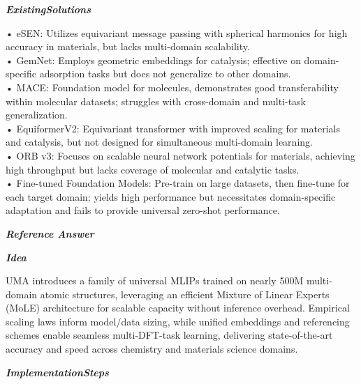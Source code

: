 \begin{tcolorbox}[
    breakable,
    title={Example of Idea Generation in Physics},
    colback=LighterGray,
    colframe=DeepPurple,
    colbacktitle=DeepPurple,
    coltitle=White,
]
\textbf{\emph{\textcolor{CaseOrange}{ExistingSolutions}}}

• eSEN: Utilizes equivariant message passing with spherical harmonics for high accuracy in materials, but lacks multi-domain scalability. \\
• GemNet: Employs geometric embeddings for catalysis; effective on domain-specific adsorption tasks but does not generalize to other domains. \\
• MACE: Foundation model for molecules, demonstrates good transferability within molecular datasets; struggles with cross-domain and multi-task generalization. \\
• EquiformerV2: Equivariant transformer with improved scaling for materials and catalysis, but not designed for simultaneous multi-domain learning. \\
• ORB v3: Focuses on scalable neural network potentials for materials, achieving high throughput but lacks coverage of molecular and catalytic tasks. \\
• Fine-tuned Foundation Models: Pre-train on large datasets, then fine-tune for each target domain; yields high performance but necessitates domain-specific adaptation and fails to provide universal zero-shot performance. 

\textbf{\emph{\textcolor{DeepPurple}{Reference Answer}}}

\textbf{\emph{\textcolor{CaseOrange}{Idea}}}

UMA introduces a family of universal MLIPs trained on nearly 500M multi-domain atomic structures,
leveraging an efficient Mixture of Linear Experts (MoLE) architecture for scalable capacity without
inference overhead. Empirical scaling laws inform model/data sizing, while unified embeddings and
referencing schemes enable seamless multi-DFT-task learning, delivering state-of-the-art accuracy
and speed across chemistry and materials science domains.

\textbf{\emph{\textcolor{CaseOrange}{ImplementationSteps}}}


\end{tcolorbox}
